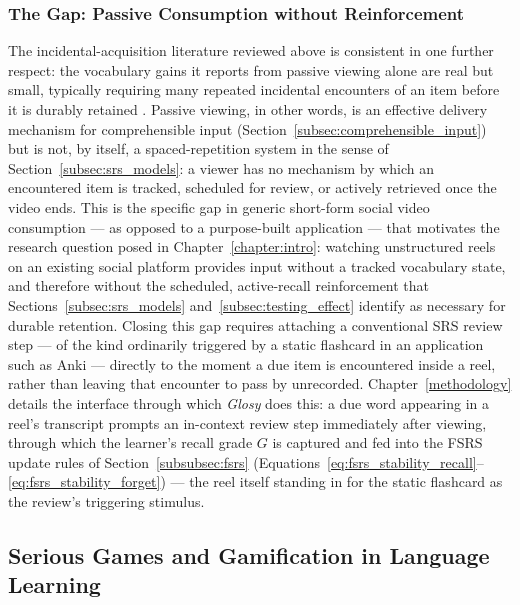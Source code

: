         \subsubsection{The Gap: Passive Consumption without Reinforcement}
        \label{subsubsec:passive_consumption_gap}
        The incidental-acquisition literature reviewed above is consistent in one further respect: the vocabulary gains it reports from passive viewing alone are real but small, typically requiring many repeated incidental encounters of an item before it is durably retained \cite{peters2018incidental}. Passive viewing, in other words, is an effective delivery mechanism for comprehensible input (Section~\ref{subsec:comprehensible_input}) but is not, by itself, a spaced-repetition system in the sense of Section~\ref{subsec:srs_models}: a viewer has no mechanism by which an encountered item is tracked, scheduled for review, or actively retrieved once the video ends. This is the specific gap in generic short-form social video consumption --- as opposed to a purpose-built application --- that motivates the research question posed in Chapter~\ref{chapter:intro}: watching unstructured reels on an existing social platform provides input without a tracked vocabulary state, and therefore without the scheduled, active-recall reinforcement that Sections~\ref{subsec:srs_models} and~\ref{subsec:testing_effect} identify as necessary for durable retention. Closing this gap requires attaching a conventional SRS review step --- of the kind ordinarily triggered by a static flashcard in an application such as Anki --- directly to the moment a due item is encountered inside a reel, rather than leaving that encounter to pass by unrecorded. Chapter~\ref{methodology} details the interface through which \textit{Glosy} does this: a due word appearing in a reel's transcript prompts an in-context review step immediately after viewing, through which the learner's recall grade $G$ is captured and fed into the FSRS update rules of Section~\ref{subsubsec:fsrs} (Equations~\ref{eq:fsrs_stability_recall}--\ref{eq:fsrs_stability_forget}) --- the reel itself standing in for the static flashcard as the review's triggering stimulus.

    \subsection{Serious Games and Gamification in Language Learning}
    \label{subsec:serious_games}

